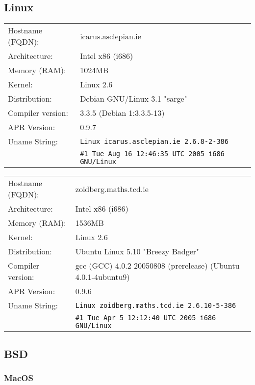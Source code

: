 \subsection{Linux}

\begin{tabular}{ll}
Hostname (FQDN):	&	icarus.asclepian.ie 				\\
Architecture:		&	Intel x86 (i686)					\\
Memory (RAM):		&	1024MB								\\
Kernel:				&	Linux 2.6							\\
Distribution:		&	Debian GNU/Linux 3.1 "sarge"	\\
Compiler version:	&	3.3.5 (Debian 1:3.3.5-13)		\\
APR Version:		&	0.9.7									\\
Uname String:		& \verb!Linux icarus.asclepian.ie 2.6.8-2-386! 		\\
						& \verb!#1 Tue Aug 16 12:46:35 UTC 2005 i686 GNU/Linux!	\\
\end{tabular}

\begin{tabular}{ll}
Hostname (FQDN):	&	zoidberg.maths.tcd.ie					\\
Architecture:		&	Intel x86 (i686)							\\
Memory (RAM):		&	1536MB										\\
Kernel:				&	Linux 2.6									\\
Distribution:		&	Ubuntu Linux 5.10 "Breezy Badger"	\\
Compiler version:	&	gcc (GCC) 4.0.2 20050808 (prerelease) (Ubuntu 4.0.1-4ubuntu9)\\
APR Version:		&	0.9.6									\\
Uname String:		& \verb!Linux zoidberg.maths.tcd.ie 2.6.10-5-386!\\
						& \verb!#1 Tue Apr 5 12:12:40 UTC 2005 i686 GNU/Linux!\\

\end{tabular}

\subsection{BSD}

\subsubsection{MacOS}

